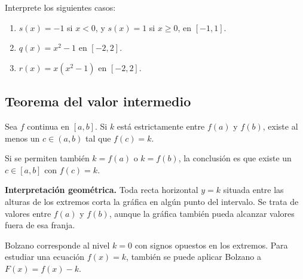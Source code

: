 \documentclass[10pt,a5paper]{article}
\newif\ifmostrarSoluciones
\begin{document}
\begin{ejemplo}
Interprete los siguientes casos:
\begin{enumerate}
  \item $s(x)=-1$ si $x<0$, y $s(x)=1$ si $x\geq0$, en $[-1,1]$.
  \item $q(x)=x^2-1$ en $[-2,2]$.
  \item $r(x)=x(x^2-1)$ en $[-2,2]$.
\end{enumerate}
\end{ejemplo}
\ifmostrarSoluciones
\begin{solucion}
\begin{enumerate}
  \item Hay signos opuestos en los extremos, pero falta continuidad en $0$. La función no tiene ceros. Un salto puede evitar el eje horizontal.
  \item Es continua y los extremos tienen el mismo valor positivo $3$. No se cumple la condición de signos opuestos, pero sí existen ceros: $-1$ y $1$. Por tanto, que no haya cambio de signo en los extremos no permite descartar ceros interiores.
  \item Es continua, $r(-2)=-6$ y $r(2)=6$, así que Bolzano se aplica. Sin embargo, hay tres ceros: $-1$, $0$ y $1$. La existencia garantizada no implica unicidad.
\end{enumerate}
\end{solucion}
\else\vspace{26mm}\fi

\subsection*{Teorema del valor intermedio}

\begin{teorema}
Sea $f$ continua en $[a,b]$. Si $k$ está estrictamente entre $f(a)$ y $f(b)$, existe al menos un $c\in(a,b)$ tal que $f(c)=k$.

Si se permiten también $k=f(a)$ o $k=f(b)$, la conclusión es que existe un $c\in[a,b]$ con $f(c)=k$.
\end{teorema}

\textbf{Interpretación geométrica.} Toda recta horizontal $y=k$ situada entre las alturas de los extremos corta la gráfica en algún punto del intervalo. Se trata de valores entre $f(a)$ y $f(b)$, aunque la gráfica también pueda alcanzar valores fuera de esa franja.

Bolzano corresponde al nivel $k=0$ con signos opuestos en los extremos. Para estudiar una ecuación $f(x)=k$, también se puede aplicar Bolzano a $F(x)=f(x)-k$.
\end{document}
